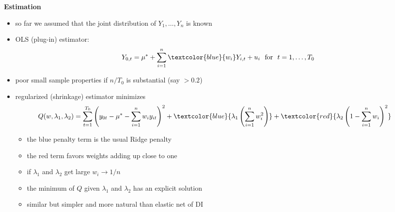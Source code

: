 \documentclass{beamer}
\newcommand{\blue}[1]{\textcolor{blue}{#1}}
\newcommand{\red}[1]{\textcolor{red}{#1}}
\begin{document}
\begin{frame}{\bf Estimation}
\begin{itemize}
\item so far we assumed that the joint distribution of $Y_1,\ldots,Y_n$ is known
\item OLS (plug-in) estimator:
{\small \begin{align*}
Y_{0,t} = \mu^* + \sum_{i=1}^n \blue{w_i} Y_{i,t} + u_i  \ \text{ for } \ t=1,\ldots,T_0
\end{align*} }
\item poor small sample properties if $n/T_0$ is substantial (say $> 0.2$)
\item regularized (shrinkage) estimator minimizes
{\footnotesize \begin{align*}
Q(w,\lambda_1,\lambda_2) &= \sum_{t=1}^{T_0} \left( y_{0t}- \mu^* - \sum_{i=1}^n w_i y_{it}\right)^2  + \blue{\lambda_1 \left( \sum_{i=1}^n w_i^2 \right)} + \red{\lambda_2 \left(1- \sum_{i=1}^n  w_i\right)^2}
\end{align*}}
\begin{itemize}
\item the blue penalty term is the usual Ridge penalty
\item the red term favors weights adding up close to one
\item if $\lambda_1$ and $\lambda_2$ get large $w_i \to 1/n$
\item the minimum of $Q$ given $\lambda_1$ and $\lambda_2$ has an explicit solution
\item similar but simpler and more natural than elastic net of DI
\end{itemize}
\end{itemize}
\end{frame}
\end{document}
